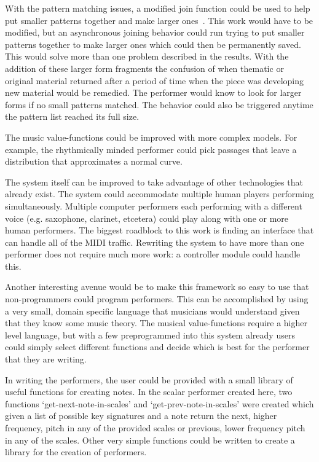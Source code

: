 \documentclass[12pt]{ucthesis}
\begin{document}
With the pattern matching issues, a modified join function could be used to help put smaller patterns together and make larger ones~\cite{slidingWindow}. This work would have to be modified, but an asynchronous joining behavior could run trying to put smaller patterns together to make larger ones which could then be permanently saved. This would solve more than one problem described in the results. With the addition of these larger form fragments the confusion of when thematic or original material returned after a period of time when the piece was developing new material would be remedied. The performer would know to look for larger forms if no small patterns matched. The behavior could also be triggered anytime the pattern list reached its full size. 

The music value-functions could be improved with more complex models. For example, the rhythmically minded performer could pick passages that leave a distribution that approximates a normal curve. 

The system itself can be improved to take advantage of other technologies that already exist. The system could accommodate multiple human players performing simultaneously. Multiple computer performers each performing with a different voice (e.g. saxophone, clarinet, etcetera) could play along with one or more human performers. The biggest roadblock to this work is finding an interface that can handle all of the MIDI traffic. Rewriting the system to have more than one performer does not require much more work:  a controller module could handle this. 

Another interesting avenue would be to make this framework so easy to use that non-programmers could program performers. This can be accomplished by using a very small, domain specific language that musicians would understand given that they know some music theory. The musical value-functions require a higher level language, but with a few preprogrammed into this system already users could simply select different functions and decide which is best for the performer that they are writing. 

In writing the performers, the user could be provided with a small library of useful functions for creating notes. In the scalar performer created here, two functions `get-next-note-in-scales' and `get-prev-note-in-scales' were created which given a list of possible key signatures and a note return the next, higher frequency, pitch in any of the provided scales or previous, lower frequency pitch in any of the scales. Other very simple functions could be written to create a library for the creation of performers. 
\end{document}
